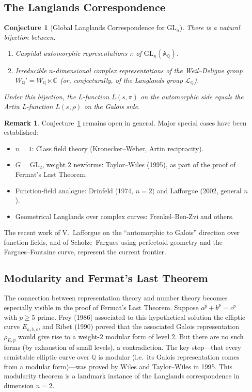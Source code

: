 \documentclass[12pt,a4paper]{amsart}
\newtheorem{conjecture}[theorem]{Conjecture}
\theoremstyle{definition}
\newtheorem{remark}[theorem]{Remark}
\begin{document}
\subsection{The Langlands Correspondence}

\begin{conjecture}[Global Langlands Correspondence for $\mathrm{GL}_n$]
\label{conj:langlands}
There is a natural bijection between:
\begin{enumerate}[label=\textup{(\roman*)}]
  \item Cuspidal automorphic representations $\pi$ of $\mathrm{GL}_n(\mathbb{A}_{\mathbb{Q}})$.
  \item Irreducible $n$-dimensional complex representations of the
        Weil--Deligne group $W_{\mathbb{Q}}' = W_{\mathbb{Q}} \ltimes \mathbb{C}$
        (or, conjecturally, of the Langlands group $\mathcal{L}_{\mathbb{Q}}$).
\end{enumerate}
Under this bijection, the L-function $L(s,\pi)$ on the automorphic side equals
the Artin L-function $L(s,\rho)$ on the Galois side.
\end{conjecture}

\begin{remark}
Conjecture~\ref{conj:langlands} remains open in general.  Major special cases
have been established:
\begin{itemize}
  \item $n=1$: Class field theory (Kronecker--Weber, Artin reciprocity).
  \item $G = \mathrm{GL}_2$, weight $2$ newforms: Taylor--Wiles (1995), as part of
        the proof of Fermat's Last Theorem.
  \item Function-field analogue: Drinfeld (1974, $n=2$) and Lafforgue (2002, general $n$).
  \item Geometrical Langlands over complex curves: Frenkel--Ben-Zvi and others.
\end{itemize}
The recent work of V.\ Lafforgue on the ``automorphic to Galois'' direction over
function fields, and of Scholze--Fargues using perfectoid geometry and the
Fargues--Fontaine curve, represent the current frontier.
\end{remark}

\subsection{Modularity and Fermat's Last Theorem}

The connection between representation theory and number theory becomes especially
visible in the proof of Fermat's Last Theorem.  Suppose $a^p + b^p = c^p$ with
$p \geq 5$ prime.  Frey (1986) associated to this hypothetical solution the
elliptic curve $E_{a,b,c}$, and Ribet (1990) proved that the associated Galois
representation $\rho_{E,p}$ would give rise to a weight-$2$ modular form of level
$2$.  But there are no such forms (by exhaustion of small levels), a contradiction.
The key step---that every semistable elliptic curve over $\mathbb{Q}$ is modular
(i.e.\ its Galois representation comes from a modular form)---was proved by
Wiles and Taylor--Wiles in 1995.  This modularity theorem is a landmark instance
of the Langlands correspondence in dimension $n = 2$.
\end{document}
